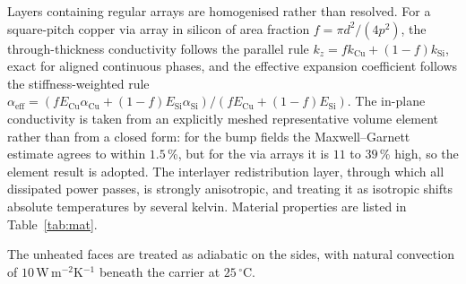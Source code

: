 \documentclass[journal]{IEEEtran}
\begin{document}
Layers containing regular arrays are homogenised rather than resolved. For a square-pitch
copper via array in silicon of area fraction $f = \pi d^{2}/(4p^{2})$, the through-thickness
conductivity follows the parallel rule $k_{z} = f k_{\mathrm{Cu}} + (1-f) k_{\mathrm{Si}}$,
exact for aligned continuous phases, and the effective expansion coefficient follows the
stiffness-weighted rule
$\alpha_{\mathrm{eff}} = (f E_{\mathrm{Cu}}\alpha_{\mathrm{Cu}} +
(1-f)E_{\mathrm{Si}}\alpha_{\mathrm{Si}})/(f E_{\mathrm{Cu}} + (1-f)E_{\mathrm{Si}})$. The
in-plane conductivity is taken from an explicitly meshed representative volume element
rather than from a closed form: for the bump fields the Maxwell--Garnett estimate agrees to
within $1.5$\,\%, but for the via arrays it is $11$ to $39$\,\% high, so the element result is
adopted. The interlayer redistribution layer, through which all dissipated power passes, is
strongly anisotropic, and treating it as isotropic shifts absolute temperatures by several
kelvin. Material properties are listed in Table~\ref{tab:mat}.

The unheated faces are treated as adiabatic on the sides, with natural convection of
$10$\,W\,m$^{-2}$K$^{-1}$ beneath the carrier at $25\,^{\circ}$C.
\end{document}
